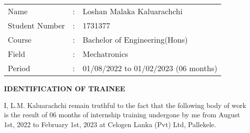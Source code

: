 \documentclass[a4paper,12pt]{article}
\begin{document}
\begin{titlepage}
			\vspace{2cm}
			\begin{large}
				\begin{flushleft}
					\begin{tabular}{lll}
						Name 			& : & Loshan Malaka Kaluarachchi \\
						Student Number 	& : & 1731377 \\
						Course 			& : & Bachelor of Engineering(Hons) \\
						Field 			& : & Mechatronics \\
						Period 			& : & 01/08/2022 to 01/02/2023 (06 months)\\
					\end{tabular}
				\end{flushleft}
			\end{large}
	\end{titlepage}
	
	
	\newpage
	\begin{center}
		\begin{Large}
			{\bf
				IDENTIFICATION OF TRAINEE
			}
		\end{Large}
	\end{center}
	\vspace{1cm}
	I, L.M. Kaluarachchi remain truthful to the fact that the following body of work is the result of 06 months of internship training undergone by me from August 1st, 2022 to February 1st, 2023 at Celogen Lanka (Pvt) Ltd, Pallekele.\\
	
\end{document}
